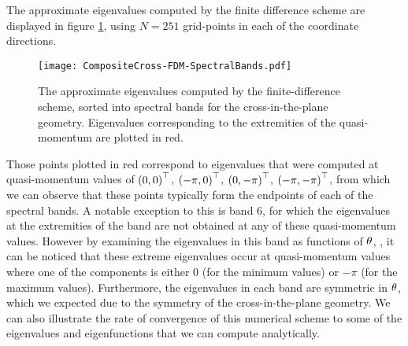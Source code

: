 The approximate eigenvalues computed by the finite difference scheme are displayed in figure \ref{fig:CompositeCross-FDM-SpectralBands}, using $N=251$ grid-points in each of the coordinate directions.
\begin{figure}[b!]
	\centering
	\texttt{[image: CompositeCross-FDM-SpectralBands.pdf]}
	\caption{\label{fig:CompositeCross-FDM-SpectralBands} The approximate eigenvalues computed by the finite-difference scheme, sorted into spectral bands for the cross-in-the-plane geometry. Eigenvalues corresponding to the extremities of the quasi-momentum are plotted in red.}
\end{figure}
Those points plotted in red correspond to eigenvalues that were computed at quasi-momentum values of $\left( 0,0 \right)^\top$, $\left( -\pi,0 \right)^\top$, $\left( 0,-\pi \right)^\top$, $\left( -\pi,-\pi \right)^\top$, from which we can observe that these points typically form the endpoints of each of the spectral bands.
A notable exception to this is band 6, for which the eigenvalues at the extremities of the band are not obtained at any of these quasi-momentum values.
However by examining the eigenvalues in this band as functions of $\theta$, , it can be noticed that these extreme eigenvalues occur at quasi-momentum values where one of the components is either 0 (for the minimum values) or $-\pi$ (for the maximum values).
Furthermore, the eigenvalues in each band are symmetric in $\theta$, which we expected due to the symmetry of the cross-in-the-plane geometry.
We can also illustrate the rate of convergence of this numerical scheme to some of the eigenvalues and eigenfunctions that we can compute analytically.
